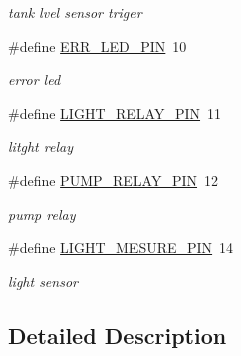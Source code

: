 \begin{DoxyCompactItemize}
\begin{DoxyCompactList}\small\item\em tank lvel sensor triger \end{DoxyCompactList}\item 
\mbox{\label{group__const_gad592c1189708ba35cb03dcebf6cc5b53}} 
\#define \hyperlink{group__const_gad592c1189708ba35cb03dcebf6cc5b53}{E\+R\+R\+\_\+\+L\+E\+D\+\_\+\+P\+IN}~10
\begin{DoxyCompactList}\small\item\em error led \end{DoxyCompactList}\item 
\mbox{\label{group__const_ga2461a31c5a9f1c0ac07d0e81ff3cbda9}} 
\#define \hyperlink{group__const_ga2461a31c5a9f1c0ac07d0e81ff3cbda9}{L\+I\+G\+H\+T\+\_\+\+R\+E\+L\+A\+Y\+\_\+\+P\+IN}~11
\begin{DoxyCompactList}\small\item\em litght relay \end{DoxyCompactList}\item 
\mbox{\label{group__const_gaf993f7047a3904a5525ef56aafdc6f6d}} 
\#define \hyperlink{group__const_gaf993f7047a3904a5525ef56aafdc6f6d}{P\+U\+M\+P\+\_\+\+R\+E\+L\+A\+Y\+\_\+\+P\+IN}~12
\begin{DoxyCompactList}\small\item\em pump relay \end{DoxyCompactList}\item 
\mbox{\label{group__const_ga5df7d07b8550062747028549f4489c84}} 
\#define \hyperlink{group__const_ga5df7d07b8550062747028549f4489c84}{L\+I\+G\+H\+T\+\_\+\+M\+E\+S\+U\+R\+E\+\_\+\+P\+IN}~14
\begin{DoxyCompactList}\small\item\em light sensor \end{DoxyCompactList}\end{DoxyCompactItemize}


\subsection{Detailed Description}
